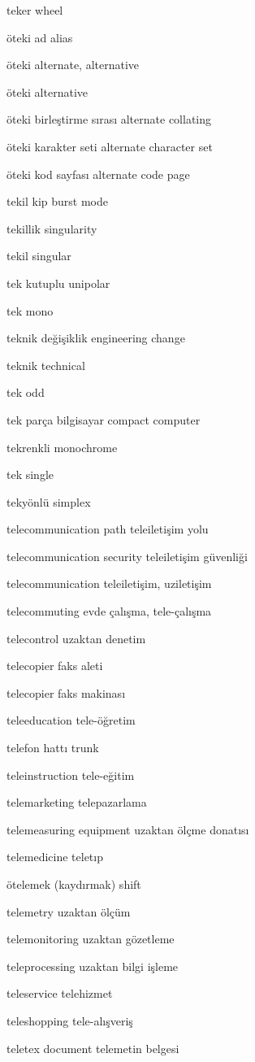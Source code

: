 \documentclass[12pt,fleqn]{article}\usepackage{../../common}
\begin{document}
teker wheel

öteki ad alias

öteki alternate, alternative

öteki alternative

öteki birleştirme sırası alternate collating

öteki karakter seti alternate character set

öteki kod sayfası alternate code page

tekil kip burst mode

tekillik singularity

tekil singular

tek kutuplu unipolar

tek mono

teknik değişiklik engineering change

teknik technical

tek odd

tek parça bilgisayar compact computer

tekrenkli monochrome

tek single

tekyönlü simplex

telecommunication path teleiletişim yolu

telecommunication security teleiletişim güvenliği

telecommunication teleiletişim, uziletişim

telecommuting evde çalışma, tele-çalışma

telecontrol uzaktan denetim

telecopier faks aleti

telecopier faks makinası

teleeducation tele-öğretim

telefon hattı trunk

teleinstruction tele-eğitim

telemarketing telepazarlama

telemeasuring equipment uzaktan ölçme donatısı

telemedicine teletıp

ötelemek (kaydırmak) shift

telemetry uzaktan ölçüm

telemonitoring uzaktan gözetleme

teleprocessing uzaktan bilgi işleme

teleservice telehizmet

teleshopping tele-alışveriş

teletex document telemetin belgesi
\end{document}

